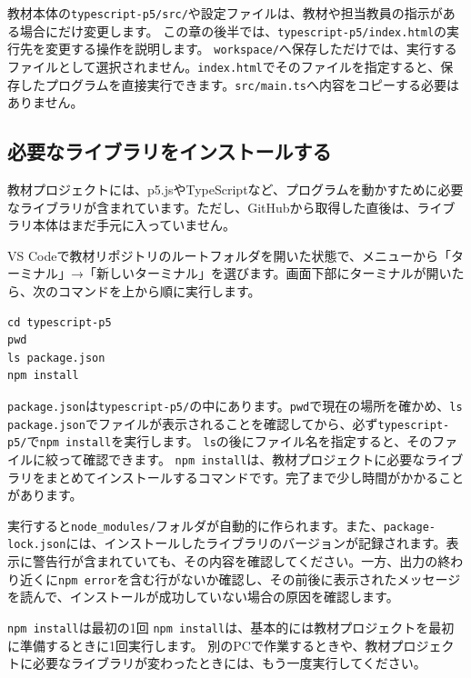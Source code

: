 教材本体の\texttt{typescript-p5/src/}や設定ファイルは、教材や担当教員の指示がある場合にだけ変更します。
この章の後半では、\texttt{typescript-p5/index.html}の実行先を変更する操作を説明します。
\texttt{workspace/}へ保存しただけでは、実行するファイルとして選択されません。\texttt{index.html}でそのファイルを指定すると、保存したプログラムを直接実行できます。\texttt{src/main.ts}へ内容をコピーする必要はありません。

\subsection{必要なライブラリをインストールする}

教材プロジェクトには、p5.jsやTypeScriptなど、プログラムを動かすために必要なライブラリが含まれています。ただし、GitHubから取得した直後は、ライブラリ本体はまだ手元に入っていません。


VS Codeで教材リポジトリのルートフォルダを開いた状態で、メニューから「ターミナル」→「新しいターミナル」を選びます。画面下部にターミナルが開いたら、次のコマンドを上から順に実行します。

\begin{listing}[htbp]
\begin{verbatim}
cd typescript-p5
pwd
ls package.json
npm install
\end{verbatim}
\caption{実行用プロジェクトで必要なライブラリをインストールするコマンド}
\label{lst:chapter01-npm-install}
\end{listing}

\texttt{package.json}は\texttt{typescript-p5/}の中にあります。\texttt{pwd}で現在の場所を確かめ、\texttt{ls package.json}でファイルが表示されることを確認してから、必ず\texttt{typescript-p5/}で\texttt{npm install}を実行します。
\texttt{ls}の後にファイル名を指定すると、そのファイルに絞って確認できます。
\texttt{npm install}は、教材プロジェクトに必要なライブラリをまとめてインストールするコマンドです。完了まで少し時間がかかることがあります。

実行すると\texttt{node\_modules/}フォルダが自動的に作られます。また、\texttt{package-lock.json}には、インストールしたライブラリのバージョンが記録されます。表示に警告行が含まれていても、その内容を確認してください。一方、出力の終わり近くに\texttt{npm error}を含む行がないか確認し、その前後に表示されたメッセージを読んで、インストールが成功していない場合の原因を確認します。

\begin{pointbox}{\texttt{npm install}は最初の1回}
\texttt{npm install}は、基本的には教材プロジェクトを最初に準備するときに1回実行します。
別のPCで作業するときや、教材プロジェクトに必要なライブラリが変わったときには、もう一度実行してください。
\end{pointbox}

